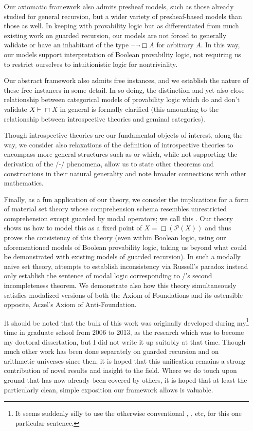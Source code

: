 Our axiomatic framework also admits presheaf models, such as those already studied for general recursion, but a wider variety of presheaf-based models than those as well. In keeping with provability logic but as differentiated from much existing work on guarded recursion, our models are not forced to generally validate or have an inhabitant of the type $\neg \neg \Box A$ for arbitrary $A$. In this way, our models support interpretation of Boolean provability logic, not requiring us to restrict ourselves to intuitionistic logic for nontriviality.

Our abstract framework also admits free instances, and we establish the nature of these free instances in some detail. In so doing, the distinction and yet also close relationship between categorical models of provability logic which do and don't validate $X \vdash \Box X$ in general is formally clarified (this amounting to the relationship between introspective theories and geminal categories).

Though introspective theories are our fundamental objects of interest, along the way, we consider also relaxations of the definition of introspective theories to encompass more general structures such as  or  which, while not supporting the derivation of the \Godel/-\Lob/ phenomena, allow us to state other theorems and constructions in their natural generality and note broader connections with other mathematics.

Finally, as a fun application of our theory, we consider the implications for a form of material set theory whose comprehension schema resembles unrestricted comprehension except guarded by modal operators; we call this . Our theory shows us how to model this as a fixed point of $X = \Box(\mathcal{P}(X))$ and thus proves the consistency of this theory (even within Boolean logic, using our aforementioned models of Boolean provability logic, taking us beyond what could be demonstrated with existing models of guarded recursion). In such a modally naive set theory, attempts to establish inconsistency via Russell's paradox instead only establish the sentence of modal logic corresponding to \Godel/'s second incompleteness theorem. We demonstrate also how this theory simultaneously satisfies modalized versions of both the Axiom of Foundations and its ostensible opposite, Aczel's Axiom of Anti-Foundation.

It should be noted that the bulk of this work was originally developed during my\footnote{It seems suddenly silly to use the otherwise conventional , , etc, for this one particular sentence.} time in graduate school from 2006 to 2013, as the research which was to become my doctoral dissertation, but I did not write it up suitably at that time. Though much other work has been done separately on guarded recursion and on arithmetic universes since then, it is hoped that this unification remains a strong contribution of novel results and insight to the field. Where we do touch upon ground that has now already been covered by others, it is hoped that at least the particularly clean, simple exposition our framework allows is valuable.

\fileend
